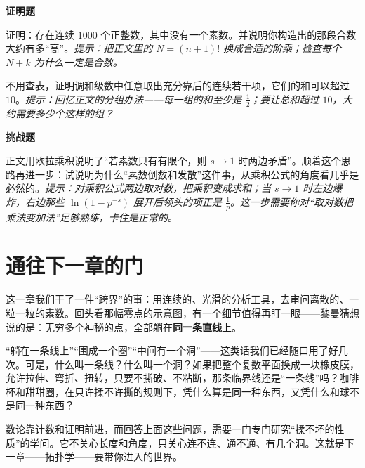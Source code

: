 \textbf{证明题}
\begin{sikao}
  \item 证明：存在连续 $1000$ 个正整数，其中没有一个素数。并说明你构造出的那段合数大约有多“高”。\emph{提示：把正文里的 $N=(n+1)!$ 换成合适的阶乘；检查每个 $N+k$ 为什么一定是合数。}
  \item 不用查表，证明调和级数中任意取出充分靠后的连续若干项，它们的和可以超过 $10$。\emph{提示：回忆正文的分组办法——每一组的和至少是 $\frac12$；要让总和超过 $10$，大约需要多少个这样的组？}
\end{sikao}

\textbf{挑战题}
\begin{sikao}
  \item 正文用欧拉乘积说明了“若素数只有有限个，则 $s\to1$ 时两边矛盾”。顺着这个思路再进一步：试说明为什么“素数倒数和发散”这件事，从乘积公式的角度看几乎是必然的。\emph{提示：对乘积公式两边取对数，把乘积变成求和；当 $s\to1$ 时左边爆炸，右边那些 $\ln(1-p^{-s})$ 展开后领头的项正是 $\frac1p$。这一步需要你对“取对数把乘法变加法”足够熟练，卡住是正常的。}
\end{sikao}

\section*{通往下一章的门}

这一章我们干了一件“跨界”的事：用连续的、光滑的分析工具，去审问离散的、一粒一粒的素数。回头看那幅零点的示意图，有一个细节值得再盯一眼——黎曼猜想说的是：无穷多个神秘的点，全部躺在\textbf{同一条直线}上。

“躺在一条线上”“围成一个圈”“中间有一个洞”——这类话我们已经随口用了好几次。可是，什么叫一条线？什么叫一个洞？如果把整个复数平面换成一块橡皮膜，允许拉伸、弯折、扭转，只要不撕破、不粘断，那条临界线还是“一条线”吗？咖啡杯和甜甜圈，在只许揉不许撕的规则下，凭什么算是同一种东西，又凭什么和球不是同一种东西？

数论靠计数和证明前进，而回答上面这些问题，需要一门专门研究“揉不坏的性质”的学问。它不关心长度和角度，只关心连不连、通不通、有几个洞。这就是下一章——拓扑学——要带你进入的世界。
